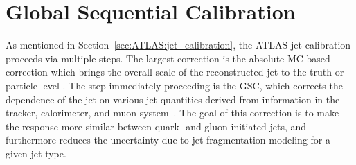 \section{Global Sequential Calibration}
\label{sec:GenNI:jetreco}
As mentioned in Section~\ref{sec:ATLAS:jet_calibration}, the ATLAS jet calibration proceeds via multiple steps.
The largest correction is the absolute MC-based correction which brings the overall scale of the reconstructed jet \ET{} to the truth or particle-level \ET{}.
The step immediately proceeding is the GSC, which corrects the dependence of the jet \pt{} on various jet quantities derived from information in the tracker, calorimeter, and muon system~\cite{PERF-2016-04}.
The goal of this correction is to make the response more similar between quark- and gluon-initiated jets, and furthermore reduces the uncertainty due to jet fragmentation modeling for a given jet type.

